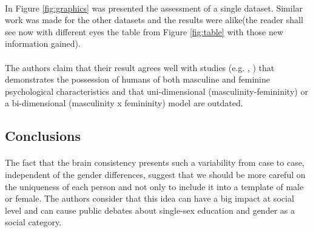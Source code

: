 \documentclass[paper=a4, fontsize=11pt]{scrartcl} %
\numberwithin{equation}{section} %
\numberwithin{figure}{section} %
\numberwithin{table}{section} %
\begin{document}
		\paragraph{}In Figure \ref{fig:graphics} was presented the assessment of a single dataset. Similar work was made for the other datasets and the results were alike(the reader shall see now with different eyes the table from Figure \ref{fig:table} with those new information gained).
		\paragraph{} 
		The authors claim that their result agrees well with studies (e.g. \cite{BONUS1}, \cite{BONUS2}) that demonstrates the possession of humans of both masculine and feminine psychological characteristics and that uni-dimensional
(masculinity-femininity) or a bi-dimensional (masculinity x femininity) model are outdated.
	
		
		

\subsection{Conclusions}\paragraph{}
The fact that the brain consistency presents such a variability from case to case,\\ independent of the gender differences, suggest that we should be more careful on\\ the uniqueness of each person and not only  to include it into a template of male or female. The authors consider that this idea can have a  big impact at social level and can cause public debates about single-sex education and gender as a social category.

\newpage
\lipsum[200] 
\end{document}
